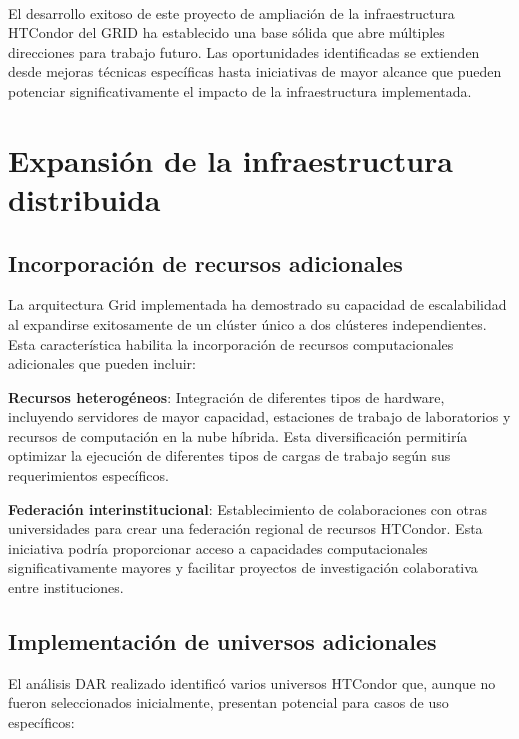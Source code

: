 \label{cap:trabajos-futuros}
\mbox{}\\

El desarrollo exitoso de este proyecto de ampliación de la infraestructura HTCondor del GRID ha establecido una base sólida que abre múltiples direcciones para trabajo futuro. Las oportunidades identificadas se extienden desde mejoras técnicas específicas hasta iniciativas de mayor alcance que pueden potenciar significativamente el impacto de la infraestructura implementada.

\section{Expansión de la infraestructura distribuida}
\noindent

\subsection{Incorporación de recursos adicionales}
\noindent

La arquitectura Grid implementada ha demostrado su capacidad de escalabilidad al expandirse exitosamente de un clúster único a dos clústeres independientes. Esta característica habilita la incorporación de recursos computacionales adicionales que pueden incluir:

\textbf{Recursos heterogéneos}: Integración de diferentes tipos de hardware, incluyendo servidores de mayor capacidad, estaciones de trabajo de laboratorios y recursos de computación en la nube híbrida. Esta diversificación permitiría optimizar la ejecución de diferentes tipos de cargas de trabajo según sus requerimientos específicos.

\textbf{Federación interinstitucional}: Establecimiento de colaboraciones con otras universidades para crear una federación regional de recursos HTCondor. Esta iniciativa podría proporcionar acceso a capacidades computacionales significativamente mayores y facilitar proyectos de investigación colaborativa entre instituciones.

\subsection{Implementación de universos adicionales}
\noindent

El análisis DAR realizado identificó varios universos HTCondor que, aunque no fueron seleccionados inicialmente, presentan potencial para casos de uso específicos:

